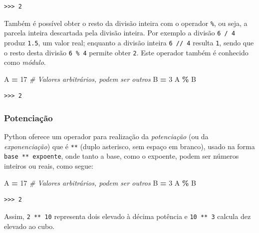 \documentclass[
]{book}
\newenvironment{Shaded}{\begin{snugshade}}{\end{snugshade}}
\newcommand{\CommentTok}[1]{\textcolor[rgb]{0.56,0.35,0.01}{\textit{#1}}}
\newcommand{\DecValTok}[1]{\textcolor[rgb]{0.00,0.00,0.81}{#1}}
\newcommand{\NormalTok}[1]{#1}
\newcommand{\OperatorTok}[1]{\textcolor[rgb]{0.81,0.36,0.00}{\textbf{#1}}}
\begin{document}
\begin{verbatim}
>>> 2
\end{verbatim}

Também é possível obter o resto da divisão inteira com o operador \texttt{\%}, ou seja, a parcela inteira descartada pela divisão inteira. Por exemplo a divisão \texttt{6\ /\ 4} produz \texttt{1.5}, um valor real; enquanto a divisão inteira \texttt{6\ //\ 4} resulta \texttt{1}, sendo que o resto desta divisão \texttt{6\ \%\ 4} permite obter \texttt{2}. Este operador também é conhecido como \emph{módulo}.

\begin{Shaded}
\begin{Highlighting}[]
\NormalTok{A }\OperatorTok{=} \DecValTok{17} \CommentTok{\# Valores arbitrários, podem ser outros}
\NormalTok{B }\OperatorTok{=} \DecValTok{3}
\NormalTok{A }\OperatorTok{\%}\NormalTok{ B}
\end{Highlighting}
\end{Shaded}

\begin{verbatim}
>>> 2
\end{verbatim}

\hypertarget{potenciauxe7uxe3o}{%
\subsubsection{Potenciação}\label{potenciauxe7uxe3o}}

Python oferece um operador para realização da \emph{potenciação} (ou da \emph{exponenciação}) que é \texttt{**} (duplo asterisco, sem espaço em branco), usado na forma \texttt{base\ **\ expoente}, onde tanto a base, como o expoente, podem ser números inteiros ou reais, como segue:

\begin{Shaded}
\begin{Highlighting}[]
\NormalTok{A }\OperatorTok{=} \DecValTok{17} \CommentTok{\# Valores arbitrários, podem ser outros}
\NormalTok{B }\OperatorTok{=} \DecValTok{3}
\NormalTok{A }\OperatorTok{\%}\NormalTok{ B}
\end{Highlighting}
\end{Shaded}

\begin{verbatim}
>>> 2
\end{verbatim}

Assim, \texttt{2\ **\ 10} representa dois elevado à décima potência e \texttt{10\ **\ 3} calcula dez elevado ao cubo.
\end{document}
